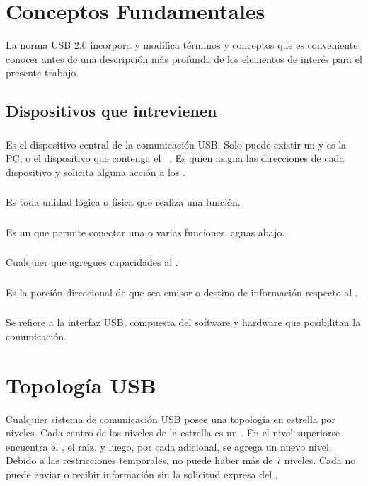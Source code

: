   \section{Conceptos Fundamentales}
  La norma USB 2.0 incorpora y modifica términos y conceptos que es conveniente
  conocer antes de una descripción más profunda de los elementos de interés para
  el presente trabajo.
    \subsection{Dispositivos que intrevienen}
      \subsubsection{\host}
      Es el dispositivo central de la comunicación USB. Solo
      puede existir un \host y es la PC, o el dispositivo que contenga el
      \host~\controller. Es quien asigna las direcciones de cada dispositivo y
      solicita alguna acción a los \devices.
      \subsubsection{\device}
      Es toda unidad lógica o física que realiza una función.
      \subsubsection{\hub}
      Es un \device que permite conectar una o varias funciones,
      aguas abajo.
      \subsubsection{\function}Cualquier \device que agregues capacidades al \host.
      \subsubsection{\ep}Es la porción direccional de \device que sea emisor
      o destino de información respecto al \host.
      \subsubsection{\controller}Se refiere a la interfaz USB, compuesta del
      software y hardware que posibilitan la comunicación.

  \section{Topología USB}
  Cualquier sistema de comunicación USB posee una topología en estrella por
  niveles. Cada centro de los niveles de la estrella es un \hub.
  En el nivel superiorse encuentra el \host%
  , el \hub raíz, y luego, por cada \hub adicional, se agrega un nuevo nivel.
  Debido a las restricciones temporales, no puede haber más de 7 niveles.
  Cada \device no puede enviar o recibir información sin la solicitud expresa
  del \host.

